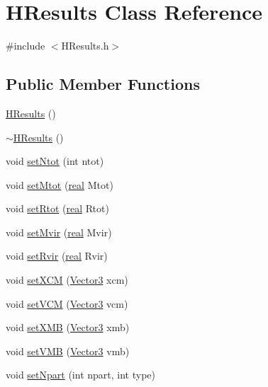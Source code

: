 \section{HResults Class Reference}
\label{classHResults}


{\ttfamily \#include $<$HResults.h$>$}

\subsection*{Public Member Functions}
\begin{DoxyCompactItemize}
\item 
\hyperlink{classHResults_af0b4ffdf2d4406e4e4c7074df85b752a}{HResults} ()
\item 
\hyperlink{classHResults_a6b47e902f388186c8f41bcf8e71b8252}{$\sim$HResults} ()
\item 
void \hyperlink{classHResults_acaef1c57079dba4a372549c01f596fec}{setNtot} (int ntot)
\item 
void \hyperlink{classHResults_a7d3c50c2af764f928f8891c9685ba495}{setMtot} (\hyperlink{Global_8h_a031f8951175b43076c2084a6c2173410}{real} Mtot)
\item 
void \hyperlink{classHResults_a70efb9c0b0afaa22be7d29efb601291a}{setRtot} (\hyperlink{Global_8h_a031f8951175b43076c2084a6c2173410}{real} Rtot)
\item 
void \hyperlink{classHResults_a0495a311c2af6707ab8a74b7a8adaff7}{setMvir} (\hyperlink{Global_8h_a031f8951175b43076c2084a6c2173410}{real} Mvir)
\item 
void \hyperlink{classHResults_ae90ebd38d753f909d52396672dd3aa84}{setRvir} (\hyperlink{Global_8h_a031f8951175b43076c2084a6c2173410}{real} Rvir)
\item 
void \hyperlink{classHResults_ad67d9d232544843e465c0d25a7139815}{setXCM} (\hyperlink{classVector3}{Vector3} xcm)
\item 
void \hyperlink{classHResults_ab8a80c15d74b17cd1ddfb056af585f85}{setVCM} (\hyperlink{classVector3}{Vector3} vcm)
\item 
void \hyperlink{classHResults_ab2f4c44def844143a8ac6e158e94c445}{setXMB} (\hyperlink{classVector3}{Vector3} xmb)
\item 
void \hyperlink{classHResults_ab9c92139174c77e0dbfd68aca55ea958}{setVMB} (\hyperlink{classVector3}{Vector3} vmb)
\item 
void \hyperlink{classHResults_aa7e6a6e1f0f8bcdea511540448e63fb6}{setNpart} (int npart, int type)
\item 

\end{DoxyCompactItemize}
